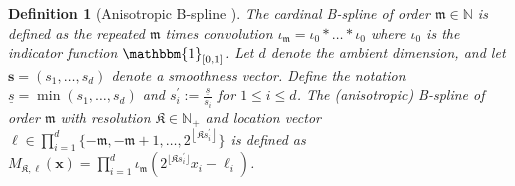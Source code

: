 \documentclass[11pt]{article}
\newcommand{\one}{\mathbbm{1}}
\newcommand{\bx}{\mathbf x}
\newcommand{\bl}{{\boldsymbol\ell}}
\newcommand{\N}{\mathbb{N}}
\newcommand{\0}{\mathbf{0}}
\newcommand{\bs}{\boldsymbol{s}}
\newtheorem{defi}{Definition}
\begin{document}
\begin{defi}[Anisotropic B-spline \citep{leisner_nonlinear_wavelet_approximation_2003}]
\label{defi:ani_b_spliine_main}
The cardinal B-spline of order $\mathfrak{m}\in \mathbb{N}$ is defined as the repeated $\mathfrak{m}$ times convolution $\iota_{\mathfrak{m}} = \iota_{0}\ast \dots \ast \iota_0$ where $\iota_0$ is the indicator function $\one_{[0,1]}$. Let $d$ denote the ambient dimension, and let $\bs = (s_1,\dots, s_d)$ denote a smoothness vector. Define the notation $\underline{s} = \min(s_1,\dots,s_{d})$ and $s_i^\prime := \frac{\underline{s}}{s_i}$ for $1\leq i\leq d$.  The (anisotropic) B-spline  of order $\mathfrak{m}$ with resolution $\mathfrak{K} \in \N_+$ and location vector $ \bl \in  \prod_{i=1}^{d}\{-\mathfrak{m},-\mathfrak{m}+1,\dots, 2^{\left\lfloor \mathfrak{K} s_i^\prime \right\rfloor} \}$ is defined as $M_{\mathfrak{K},\bl}(\bx) = \prod_{i=1}^{d} \iota_{\mathfrak{m}} (2^{\lfloor \mathfrak{K} s_i^\prime \rfloor}x_i - \ell_i)$.
\end{defi}
\noindent
\end{document}
